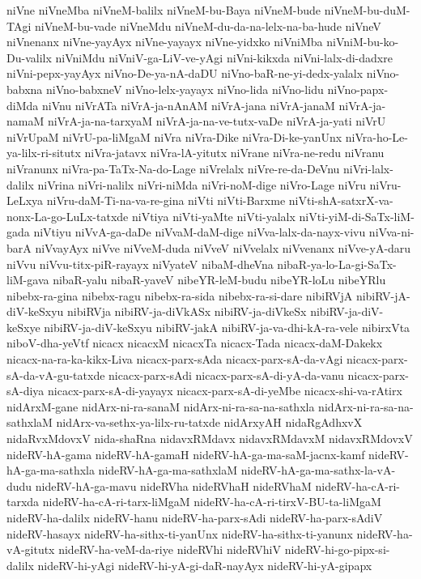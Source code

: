 {niVne
niVneMba
niVneM-balilx
niVneM-bu-Baya
niVneM-bude
niVneM-bu-duM-TAgi
niVneM-bu-vade
niVneMdu
niVneM-du-da-na-lelx-na-ba-hude
niVneV
niVnenanx
niVne-yayAyx
niVne-yayayx
niVne-yidxko
niVniMba
niVniM-bu-ko-Du-valilx
niVniMdu
niVniV-ga-LiV-ve-yAgi
niVni-kikxda
niVni-lalx-di-dadxre
niVni-pepx-yayAyx
niVno-De-ya-nA-daDU
niVno-baR-ne-yi-dedx-yalalx
niVno-babxna
niVno-babxneV
niVno-lelx-yayayx
niVno-lida
niVno-lidu
niVno-papx-diMda
niVnu
niVrATa
niVrA-ja-nAnAM
niVrA-jana
niVrA-janaM
niVrA-ja-namaM
niVrA-ja-na-tarxyaM
niVrA-ja-na-ve-tutx-vaDe
niVrA-ja-yati
niVrU
niVrUpaM
niVrU-pa-liMgaM
niVra
niVra-Dike
niVra-Di-ke-yanUnx
niVra-ho-Le-ya-lilx-ri-situtx
niVra-jatavx
niVra-lA-yitutx
niVrane
niVra-ne-redu
niVranu
niVranunx
niVra-pa-TaTx-Na-do-Lage
niVrelalx
niVre-re-da-DeVnu
niVri-lalx-dalilx
niVrina
niVri-nalilx
niVri-niMda
niVri-noM-dige
niVro-Lage
niVru
niVru-LeLxya
niVru-daM-Ti-na-va-re-gina
niVti
niVti-Barxme
niVti-shA-satxrX-va-nonx-La-go-LuLx-tatxde
niVtiya
niVti-yaMte
niVti-yalalx
niVti-yiM-di-SaTx-liM-gada
niVtiyu
niVvA-ga-daDe
niVvaM-daM-dige
niVva-lalx-da-nayx-vivu
niVva-ni-barA
niVvayAyx
niVve
niVveM-duda
niVveV
niVvelalx
niVvenanx
niVve-yA-daru
niVvu
niVvu-titx-piR-rayayx
niVyateV
nibaM-dheVna
nibaR-ya-lo-La-gi-SaTx-liM-gava
nibaR-yalu
nibaR-yaveV
nibeYR-leM-budu
nibeYR-loLu
nibeYRlu
nibebx-ra-gina
nibebx-ragu
nibebx-ra-sida
nibebx-ra-si-dare
nibiRVjA
nibiRV-jA-diV-keSxyu
nibiRVja
nibiRV-ja-diVkASx
nibiRV-ja-diVkeSx
nibiRV-ja-diV-keSxye
nibiRV-ja-diV-keSxyu
nibiRV-jakA
nibiRV-ja-va-dhi-kA-ra-vele
nibirxVta
niboV-dha-yeVtf
nicacx
nicacxM
nicacxTa
nicacx-Tada
nicacx-daM-Dakekx
nicacx-na-ra-ka-kikx-Liva
nicacx-parx-sAda
nicacx-parx-sA-da-vAgi
nicacx-parx-sA-da-vA-gu-tatxde
nicacx-parx-sAdi
nicacx-parx-sA-di-yA-da-vanu
nicacx-parx-sA-diya
nicacx-parx-sA-di-yayayx
nicacx-parx-sA-di-yeMbe
nicacx-shi-va-rAtirx
nidArxM-gane
nidArx-ni-ra-sanaM
nidArx-ni-ra-sa-na-sathxla
nidArx-ni-ra-sa-na-sathxlaM
nidArx-va-sethx-ya-lilx-ru-tatxde
nidArxyAH
nidaRgAdhxvX
nidaRvxMdovxV
nida-shaRna
nidavxRMdavx
nidavxRMdavxM
nidavxRMdovxV
nideRV-hA-gama
nideRV-hA-gamaH
nideRV-hA-ga-ma-saM-jacnx-kamf
nideRV-hA-ga-ma-sathxla
nideRV-hA-ga-ma-sathxlaM
nideRV-hA-ga-ma-sathx-la-vA-dudu
nideRV-hA-ga-mavu
nideRVha
nideRVhaH
nideRVhaM
nideRV-ha-cA-ri-tarxda
nideRV-ha-cA-ri-tarx-liMgaM
nideRV-ha-cA-ri-tirxV-BU-ta-liMgaM
nideRV-ha-dalilx
nideRV-hanu
nideRV-ha-parx-sAdi
nideRV-ha-parx-sAdiV
nideRV-hasayx
nideRV-ha-sithx-ti-yanUnx
nideRV-ha-sithx-ti-yanunx
nideRV-ha-vA-gitutx
nideRV-ha-veM-da-riye
nideRVhi
nideRVhiV
nideRV-hi-go-pipx-si-dalilx
nideRV-hi-yAgi
nideRV-hi-yA-gi-daR-nayAyx
nideRV-hi-yA-gipapx
}
